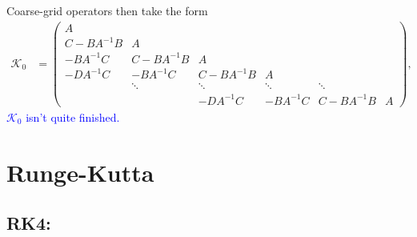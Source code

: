 \documentclass[a4paper,12pt]{article}
\newcommand{\tcb}{\textcolor{blue}}
\begin{document}
Coarse-grid operators then take the form
%
\begin{align*}
\mathcal{K}_0 & =
\begin{pmatrix}
	A \\
	C - BA^{-1}B& A \\ 
	-BA^{-1}C & C- BA^{-1}B & A \\
	- DA^{-1}C & - BA^{-1}C & C - BA^{-1}B & A \\
	& \ddots & \ddots & \ddots & \ddots \\
	& & - DA^{-1}C & -BA^{-1}C & C - BA^{-1}B & A
\end{pmatrix},
\end{align*}
%
\tcb{$\mathcal{K}_0$ isn't quite finished.}





\newpage
\section{Runge-Kutta}

\subsection{RK4:} 
\end{document}
